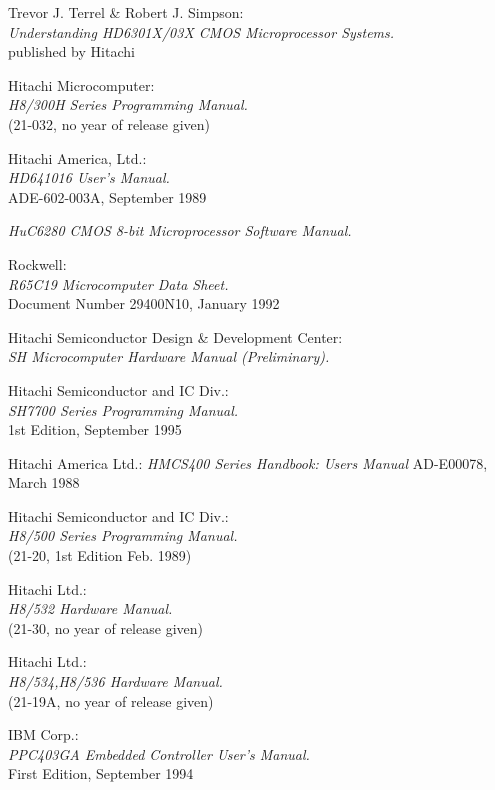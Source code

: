  Trevor J. Terrel \& Robert J. Simpson: \\
		{\em Understanding HD6301X/03X CMOS Microprocessor Systems.\/} \\
		published by Hitachi

 Hitachi Microcomputer: \\
		{\em H8/300H Series Programming Manual.\/} \\
		(21-032, no year of release given)

 Hitachi America, Ltd.: \\
		{\em HD641016 User's Manual.\/} \\
		ADE-602-003A, September 1989

 {\em HuC6280 CMOS 8-bit Microprocessor Software Manual.\/}

 Rockwell: \\
		{\em R65C19 Microcomputer Data Sheet.\/} \\
		Document Number 29400N10, January 1992

 Hitachi Semiconductor Design \& Development Center: \\
		{\em SH Microcomputer Hardware Manual
		(Preliminary).\/}

 Hitachi Semiconductor and IC Div.: \\
		{\em SH7700 Series Programming Manual.\/} \\
		1st Edition, September 1995

 Hitachi America Ltd.:
		{\em HMCS400 Series Handbook: Users Manual\/}
		AD-E00078, March 1988

 Hitachi Semiconductor and IC Div.: \\
		{\em H8/500 Series Programming Manual.\/} \\
		(21-20, 1st Edition Feb. 1989)

 Hitachi Ltd.: \\
		{\em H8/532 Hardware Manual.\/} \\
		(21-30, no year of release given)

 Hitachi Ltd.: \\
		{\em H8/534,H8/536 Hardware Manual.\/} \\
		(21-19A, no year of release given)

 IBM Corp.: \\
		{\em PPC403GA Embedded Controller User's Manual.\/} \\
		First Edition, September 1994

